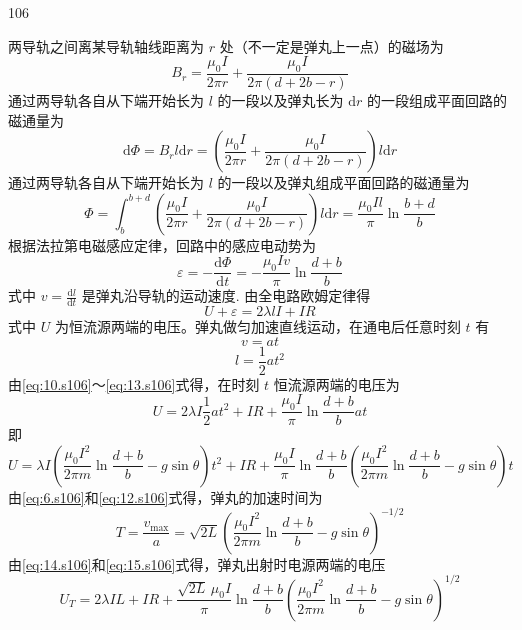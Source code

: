 \begin{solution}{106}
\begin{subsolution}
两导轨之间离某导轨轴线距离为 $r$ 处（不一定是弹丸上一点）的磁场为
\begin{equation}
B_{r} = \frac{\mu_{0} I}{2\pi r} + \frac{\mu_{0} I}{2\pi (d + 2b - r)}
\label{eq:7.s106}
\end{equation}
通过两导轨各自从下端开始长为 $l$ 的一段以及弹丸长为 $\mathrm{d}r$ 的一段组成平面回路的磁通量为
\begin{equation}
\mathrm{d}\Phi = B_{r} l \mathrm{d}r = \left(\frac{\mu_{0} I}{2\pi r} + \frac{\mu_{0} I}{2\pi (d + 2b - r)}\right) l \mathrm{d}r
\label{eq:8.s106}
\end{equation}
通过两导轨各自从下端开始长为 $l$ 的一段以及弹丸组成平面回路的磁通量为
\begin{equation}
\Phi = \int_{b}^{b+d} \left(\frac{\mu_{0} I}{2\pi r} + \frac{\mu_{0} I}{2\pi (d + 2b - r)}\right) l \mathrm{d}r = \frac{\mu_{0} I l}{\pi}\ln\frac{b+d}{b}
\label{eq:9.s106}
\end{equation}
根据法拉第电磁感应定律，回路中的感应电动势为
\begin{equation}
\varepsilon = -\frac{\mathrm{d}\Phi}{\mathrm{d}t} = -\frac{\mu_{0} I v}{\pi}\ln\frac{d+b}{b}
\label{eq:10.s106}
\end{equation}
式中 $v = \frac{\mathrm{d}l}{\mathrm{d}t}$ 是弹丸沿导轨的运动速度. 由全电路欧姆定律得
\begin{equation}
U + \varepsilon = 2\lambda l I + I R
\label{eq:11.s106}
\end{equation}
式中 $U$ 为恒流源两端的电压。弹丸做匀加速直线运动，在通电后任意时刻 $t$ 有
\begin{equation}
v = a t
\label{eq:12.s106}
\end{equation}
\begin{equation}
l = \frac{1}{2} a t^{2}
\label{eq:13.s106}
\end{equation}
由\eqref{eq:10.s106}～\eqref{eq:13.s106}式得，在时刻 $t$ 恒流源两端的电压为
\[
U = 2\lambda I \frac{1}{2} a t^{2} + I R + \frac{\mu_{0} I}{\pi}\ln\frac{d+b}{b} a t
\]
即
\begin{equation}
U = \lambda I \left(\frac{\mu_{0} I^{2}}{2\pi m}\ln\frac{d+b}{b} - g\sin\theta\right) t^{2} + I R + \frac{\mu_{0} I}{\pi}\ln\frac{d+b}{b} \left(\frac{\mu_{0} I^{2}}{2\pi m}\ln\frac{d+b}{b} - g\sin\theta\right) t
\label{eq:14.s106}
\end{equation}
由\eqref{eq:6.s106}和\eqref{eq:12.s106}式得，弹丸的加速时间为
\begin{equation}
T = \frac{v_{\max}}{a} = \sqrt{2L}\left(\frac{\mu_{0} I^{2}}{2\pi m}\ln\frac{d+b}{b} - g\sin\theta\right)^{-1/2}
\label{eq:15.s106}
\end{equation}
由\eqref{eq:14.s106}和\eqref{eq:15.s106}式得，弹丸出射时电源两端的电压
\begin{equation}
U_{T} = 2\lambda I L + I R + \frac{\sqrt{2L}\,\mu_{0} I}{\pi}\ln\frac{d+b}{b} \left(\frac{\mu_{0} I^{2}}{2\pi m}\ln\frac{d+b}{b} - g\sin\theta\right)^{1/2}
\label{eq:16.s106}
\end{equation}
\end{subsolution}


\end{solution}
